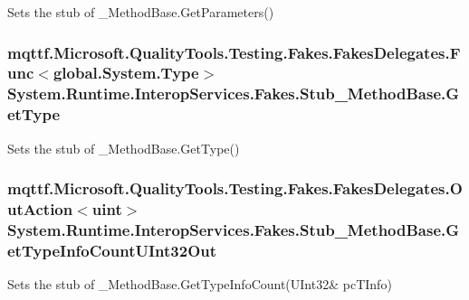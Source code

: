 Sets the stub of \-\_\-\-Method\-Base.\-Get\-Parameters()

\hypertarget{class_system_1_1_runtime_1_1_interop_services_1_1_fakes_1_1_stub___method_base_a42351251dc436c3be4b20bc30752885f}{
\subsubsection[{Get\-Type}]{\setlength{\rightskip}{0pt plus 5cm}mqttf.\-Microsoft.\-Quality\-Tools.\-Testing.\-Fakes.\-Fakes\-Delegates.\-Func$<$global.\-System.\-Type$>$ System.\-Runtime.\-Interop\-Services.\-Fakes.\-Stub\-\_\-\-Method\-Base.\-Get\-Type}}\label{class_system_1_1_runtime_1_1_interop_services_1_1_fakes_1_1_stub___method_base_a42351251dc436c3be4b20bc30752885f}


Sets the stub of \-\_\-\-Method\-Base.\-Get\-Type()

\hypertarget{class_system_1_1_runtime_1_1_interop_services_1_1_fakes_1_1_stub___method_base_aae6c913185290b33a139fefc67a41801}{
\subsubsection[{Get\-Type\-Info\-Count\-U\-Int32\-Out}]{\setlength{\rightskip}{0pt plus 5cm}mqttf.\-Microsoft.\-Quality\-Tools.\-Testing.\-Fakes.\-Fakes\-Delegates.\-Out\-Action$<$uint$>$ System.\-Runtime.\-Interop\-Services.\-Fakes.\-Stub\-\_\-\-Method\-Base.\-Get\-Type\-Info\-Count\-U\-Int32\-Out}}\label{class_system_1_1_runtime_1_1_interop_services_1_1_fakes_1_1_stub___method_base_aae6c913185290b33a139fefc67a41801}


Sets the stub of \-\_\-\-Method\-Base.\-Get\-Type\-Info\-Count(U\-Int32\& pc\-T\-Info)

